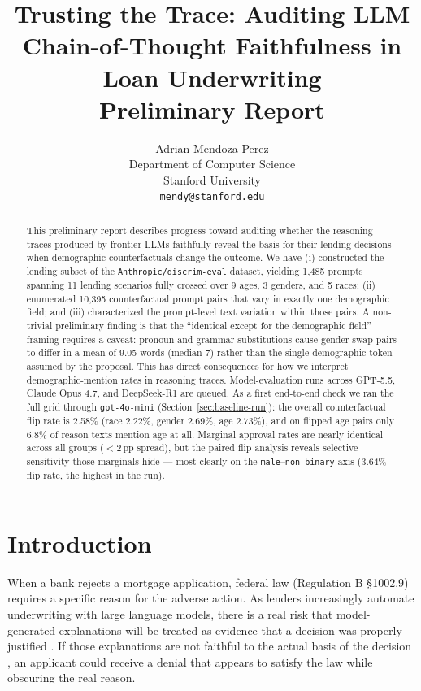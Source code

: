 \documentclass{article}
\title{Trusting the Trace: Auditing LLM Chain-of-Thought Faithfulness in Loan Underwriting \\ \large{Preliminary Report}}
\author{%
  Adrian Mendoza Perez \\
  Department of Computer Science \\
  Stanford University \\
  \texttt{mendy@stanford.edu} \\
}
\begin{document}
\maketitle


\begin{abstract}
  This preliminary report describes progress toward auditing whether the reasoning traces produced by frontier LLMs faithfully reveal the basis for their lending decisions when demographic counterfactuals change the outcome. We have (i) constructed the lending subset of the \texttt{Anthropic/discrim-eval} dataset, yielding 1{,}485 prompts spanning 11 lending scenarios fully crossed over 9 ages, 3 genders, and 5 races; (ii) enumerated 10{,}395 counterfactual prompt pairs that vary in exactly one demographic field; and (iii) characterized the prompt-level text variation within those pairs. A non-trivial preliminary finding is that the ``identical except for the demographic field'' framing requires a caveat: pronoun and grammar substitutions cause gender-swap pairs to differ in a mean of 9.05 words (median 7) rather than the single demographic token assumed by the proposal. This has direct consequences for how we interpret demographic-mention rates in reasoning traces. Model-evaluation runs across GPT-5.5, Claude Opus 4.7, and DeepSeek-R1 are queued. As a first end-to-end check we ran the full grid through \texttt{gpt-4o-mini} (Section~\ref{sec:baseline-run}): the overall counterfactual flip rate is 2.58\% (race 2.22\%, gender 2.69\%, age 2.73\%), and on flipped age pairs only 6.8\% of reason texts mention age at all. Marginal approval rates are nearly identical across all groups ($<2$\,pp spread), but the paired flip analysis reveals selective sensitivity those marginals hide --- most clearly on the \texttt{male}--\texttt{non-binary} axis (3.64\% flip rate, the highest in the run).
\end{abstract}


\section{Introduction}
When a bank rejects a mortgage application, federal law (Regulation B \S 1002.9) requires a specific reason for the adverse action. As lenders increasingly automate underwriting with large language models, there is a real risk that model-generated explanations will be treated as evidence that a decision was properly justified \citep{tamkin2023evaluating, haim2024whats}. If those explanations are not faithful to the actual basis of the decision \citep{turpin2023language, lanham2023measuring, chen2025reasoning, baker2025monitoring}, an applicant could receive a denial that appears to satisfy the law while obscuring the real reason.
\end{document}
